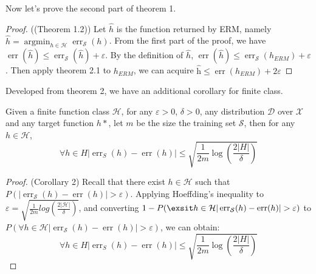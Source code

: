 Now let's prove the second part of theorem 1.
\begin{proof}((Theorem 1.2))
Let $\hat{h}$ is the function returned by ERM, namely $\hat{h} = \operatorname{argmin}_{h \in \mathcal{H}}\operatorname{err}_{\mathcal{S}}(h)$. From the first part of the proof, we have $\operatorname{err}(\hat{h}) \leq \operatorname{err}_{\mathcal{S}}(\hat{h}) + \varepsilon$. By the definition of $\hat{h}$, $\operatorname{err}(\hat{h}) \leq \operatorname{err}_{\mathcal{S}}(h_{ERM}) + \varepsilon$. Then apply theorem 2.1 to $h_{ERM}$, we can acquire $\operatorname{\hat{h}} \leq \operatorname{err}(h_{ERM}) + 2\varepsilon$
\end{proof}

Developed from theorem 2, we have an additional corollary for finite class.

\begin{corollary}
Given a finite function class $\mathcal{H}$, for any $\varepsilon > 0$, $\delta > 0$, any distribution $\mathcal{D}$ over $\mathcal{X}$ and any target function $h*$, let $m$ be the size the training set $\mathcal{S}$, then for any $h \in \mathcal{H}$,
\begin{equation*}
    \forall h \in H\left|\operatorname{err}_{S}(h)-\operatorname{err}(h)\right| \leq \sqrt{\frac{1}{2 m} \log \left(\frac{2|H|}{\delta}\right)}
\end{equation*}
\end{corollary}

\begin{proof} (Corollary 2)
Recall that there exist $h\in \mathcal{H}$ such that $P(|\operatorname{err}_{\mathcal{S}}(h) - \operatorname{err}(h)| > \varepsilon) $. Applying Hoeffding's inequality to $\varepsilon = \sqrt{\frac{1}{2m}log(\frac{2|\mathcal{H}|}{\delta})}$, and converting $1 - P(\exsit h\in \mathcal{H}|\operatorname{err}_{\mathcal{S}}(h) - \operatorname{err}(h)| > \varepsilon) $ to $P(\forall h\in \mathcal{H}|\operatorname{err}_{\mathcal{S}}(h) - \operatorname{err}(h)| > \varepsilon)$, we can obtain:
\begin{equation*}
    \forall h \in H\left|\operatorname{err}_{S}(h)-\operatorname{err}(h)\right| \leq \sqrt{\frac{1}{2 m} \log \left(\frac{2|H|}{\delta}\right)}
\end{equation*}
\end{proof}